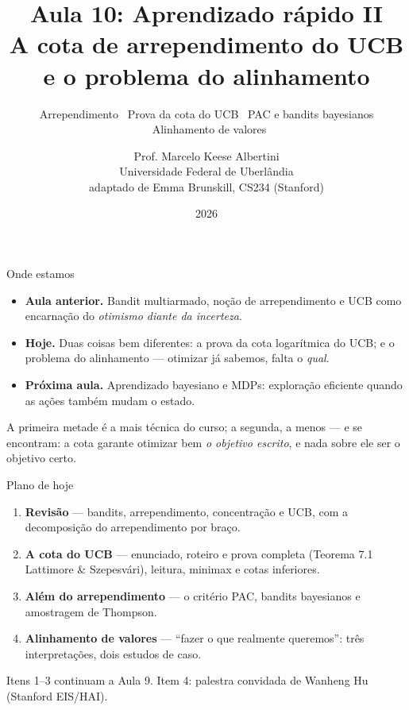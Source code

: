 \documentclass[aspectratio=169, 11pt]{beamer}
\title[Aula 10 — Aprendizado rápido II]{Aula 10: Aprendizado rápido II\\
  A cota de arrependimento do UCB e o problema do alinhamento}
\subtitle[Aprendizagem por Reforço]{Arrependimento \textbullet\ Prova da cota do UCB
  \textbullet\ PAC e bandits bayesianos \textbullet\ Alinhamento de valores}
\author[Prof. Marcelo K. Albertini]{Prof. Marcelo Keese Albertini \\
  \footnotesize Universidade Federal de Uberlândia \\
  \footnotesize adaptado de Emma Brunskill, CS234 (Stanford)}
\institute{Universidade Federal de Uberlândia}
\date{2026}
\begin{document}
\begin{frame}\titlepage\end{frame}

\begin{frame}{Onde estamos}
  \begin{itemize}
    \item \textbf{Aula anterior.} Bandit multiarmado, noção de
          \alert{arrependimento} e UCB como encarnação do \emph{otimismo
          diante da incerteza}.
    \item \textbf{Hoje.} Duas coisas bem diferentes: a \alert{prova} da cota
          logarítmica do UCB; e o \alert{problema do alinhamento} ---
          otimizar já sabemos, falta o \emph{qual}.
    \item \textbf{Próxima aula.} Aprendizado bayesiano e MDPs: exploração
          eficiente quando as ações também mudam o estado.
  \end{itemize}

  \begin{ideiabox}
    A primeira metade é a mais técnica do curso; a segunda, a menos --- e se
    encontram: a cota garante otimizar bem \emph{o objetivo escrito}, e nada
    sobre ele ser o objetivo certo.
  \end{ideiabox}
\end{frame}

\begin{frame}{Plano de hoje}
  \begin{enumerate}
    \item \textbf{Revisão} --- bandits, arrependimento, concentração e UCB,
          com a decomposição do arrependimento por braço.
    \item \textbf{A cota do UCB} --- enunciado, roteiro e prova completa
          (Teorema 7.1 Lattimore \& Szepesvári), leitura, minimax e cotas
          inferiores.
    \item \textbf{Além do arrependimento} --- o critério PAC, bandits
          bayesianos e amostragem de Thompson.
    \item \textbf{Alinhamento de valores} --- ``fazer o que realmente
          queremos'': três interpretações, dois estudos de caso.
  \end{enumerate}

  \medskip
  {\small\color{rlCinza} Itens 1--3 continuam a Aula 9. Item 4: palestra
  convidada de Wanheng Hu (Stanford EIS/HAI).}
\end{frame}
\end{document}
